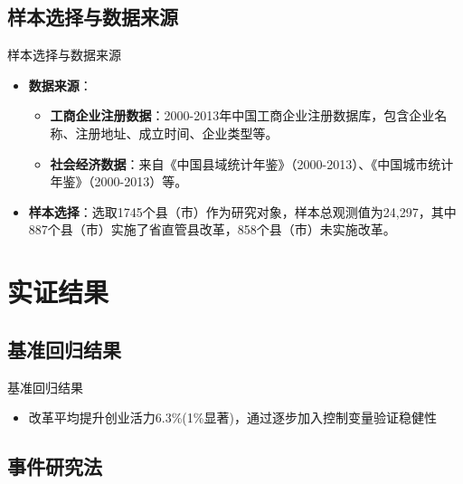 \documentclass{beamer}
\newcommand{\tightlist}{%
  \setlength{\itemsep}{0pt}\setlength{\parskip}{0pt}}
\begin{document}
\subsection{样本选择与数据来源}\label{ux6837ux672cux9009ux62e9ux4e0eux6570ux636eux6765ux6e90}

\begin{frame}{样本选择与数据来源}
\begin{itemize}
\tightlist
\item
  \textbf{数据来源}：

  \begin{itemize}
  \tightlist
  \item
    \textbf{工商企业注册数据}：2000-2013年中国工商企业注册数据库，包含企业名称、注册地址、成立时间、企业类型等。
  \item
    \textbf{社会经济数据}：来自《中国县域统计年鉴》（2000-2013）、《中国城市统计年鉴》（2000-2013）等。
  \end{itemize}
\item
  \textbf{样本选择}：选取1745个县（市）作为研究对象，样本总观测值为24,297，其中887个县（市）实施了省直管县改革，858个县（市）未实施改革。
\end{itemize}
\end{frame}

\section{实证结果}\label{ux5b9eux8bc1ux7ed3ux679c}

\subsection{基准回归结果}\label{ux57faux51c6ux56deux5f52ux7ed3ux679c}

\begin{frame}{基准回归结果}
\begin{adjustbox}{max width=0.95\textwidth}

\end{adjustbox}

\begin{itemize}
\tightlist
\item
  改革平均提升创业活力6.3\%(1\%显著)，通过逐步加入控制变量验证稳健性
\end{itemize}
\end{frame}

\subsection{事件研究法}\label{ux4e8bux4ef6ux7814ux7a76ux6cd5}
\end{document}
